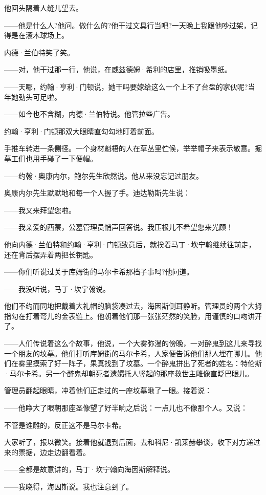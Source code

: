 \par 他回头隔着人缝儿望去。
\par ——他是什么人?他问。做什么的?他干过文具行当吧?一天晚上我跟他吵过架，记得是在滚木球场上。
\par 内德·兰伯特笑了笑。
\par ——对，他干过那一行，他说，在威兹德姆·希利的店里，推销吸墨纸。
\par ——天哪，约翰·亨利·门顿说，她干吗要嫁给这么一个上不了台盘的家伙呢?当年她劲头可足啦。
\par ——如今也不含糊，内德·兰伯特说。他管拉些广告。
\par 约翰·亨利·门顿那双大眼睛直勾勾地盯着前面。
\par 手推车转进一条侧径。一个身材魁梧的人在草丛里伫候，举举帽子来表示敬意。掘墓工们也用手碰了一下便帽。
\par ——约翰·奥康内尔，鲍尔先生欣然说。他从来没忘记过朋友。
\par 奥康内尔先生默默地和每一个人握了手。迪达勒斯先生说：
\par ——我又来拜望您啦。
\par ——我亲爱的西蒙，公墓管理员悄声回答说。我压根儿不希望您来光顾！
\par 他向内德·兰伯特和约翰·亨利·门顿致意后，就挨着马丁·坎宁翰继续往前走，还在背后摆弄着两把长钥匙。
\par ——你们听说过关于库姆街的马尔卡希那档子事吗?他问道。
\par ——我没听说，马丁·坎宁翰说。
\par 他们不约而同地把戴着大礼帽的脑袋凑过去，海因斯侧耳静听。管理员的两个大拇指勾在打着弯儿的金表链上。他朝着他们那一张张茫然的笑脸，用谨慎的口吻讲开了。
\par ——人们传说着这么个故事，他说，一个大雾弥漫的傍晚，一对醉鬼到这儿来寻找一个朋友的坟墓。他们打听库姆街的马尔卡希，人家便告诉他们那人埋在哪儿。他们在雾里摸索了好一阵子，果真找到了坟墓。一个醉鬼拼出了死者的姓名：特伦斯·马尔卡希。另一个醉鬼却朝死者遗孀托人竖起的那座救世主雕像直眨巴眼儿。
\par 管理员翻起眼睛，冲着他们正走过的一座坟墓瞅了一眼。接着说：
\par ——他睁大了眼朝那座圣像望了好半晌之后说：一点儿也不像那个人。又说：
\par 不管是谁雕的，反正这不是马尔卡希。
\par 大家听了，报以微笑。接着他就退到后面，去和科尼·凯莱赫攀谈，收下对方递过来的票据，边走边翻看着。
\par ——全都是故意讲的，马丁·坎宁翰向海因斯解释说。
\par ——我晓得，海因斯说。我也注意到了。

